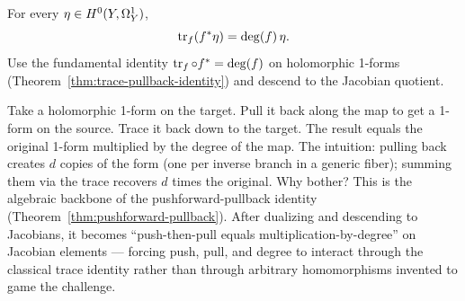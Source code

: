 
\begin{theorem}
\label{thm:trace-pullback}
For every \(\eta\in H^{0}(Y,\Omega^{1}_{Y})\),
\[
  \operatorname{tr}_f(f^{*}\eta)=\deg(f)\,\eta.
\]
\leanok
\proofplan
Use the fundamental identity \(\operatorname{tr}_f \circ f^* = \deg(f)\) on holomorphic 1-forms
(Theorem~\ref{thm:trace-pullback-identity}) and descend to the Jacobian quotient.
\end{theorem}

\begin{layman}
Take a holomorphic 1-form on the target. Pull it back along the map
to get a 1-form on the source. Trace it back down to the target. The
result equals the original 1-form multiplied by the degree of the
map. The intuition: pulling back creates \(d\) copies of the form (one
per inverse branch in a generic fiber); summing them via the trace
recovers \(d\) times the original. Why bother? This is the algebraic
backbone of the pushforward-pullback identity
(Theorem~\ref{thm:pushforward-pullback}). After dualizing and
descending to Jacobians, it becomes ``push-then-pull equals
multiplication-by-degree'' on Jacobian elements --- forcing push, pull,
and degree to interact through the classical trace identity rather
than through arbitrary homomorphisms invented to game the challenge.
\end{layman}
